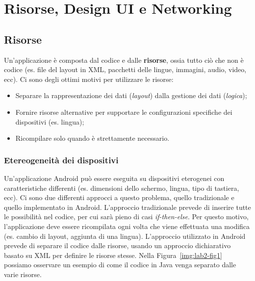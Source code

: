 \newcommand{\myparagraph}[1]{\paragraph{#1}\mbox{}\\}

\chapter{Risorse, Design UI e Networking}

\section{Risorse}

Un'applicazione è composta dal codice e dalle \textbf{risorse}, ossia tutto ciò
che non è codice (es. file del layout in XML, pacchetti delle lingue, immagini,
audio, video, ecc).
Ci sono degli ottimi motivi per utilizzare le risorse:

\begin{itemize}
\item Separare la rappresentazione dei dati (\textit{layout}) dalla gestione dei
dati (\textit{logica});
\item Fornire risorse alternative per supportare le configurazioni specifiche
dei dispositivi (es. lingua);
\item Ricompilare solo quando è strettamente necessario.
\end{itemize}

\subsection{Etereogeneità dei dispositivi}

Un'applicazione Android può essere eseguita su dispositivi eterogenei con
caratteristiche differenti (es. dimensioni dello schermo, lingua, tipo di
tastiera, ecc). Ci sono due differenti approcci a questo problema, quello
tradizionale e quello implementato in Android.
L'approccio tradizionale prevede di inserire tutte le possibilità nel codice,
per cui sarà pieno di casi \emph{if-then-else}. Per questo motivo,
l'applicazione deve essere ricompilata ogni volta che viene effettuata una
modifica (es. cambio di layout, aggiunta di una lingua).
L'approccio utilizzato in Android prevede di separare il codice dalle risorse,
usando un approccio dichiarativo basato su XML per definire le risorse stesse.
Nella Figura~\ref{img:lab2-fig1} possiamo osservare un esempio di come il codice
in Java venga separato dalle varie risorse.

